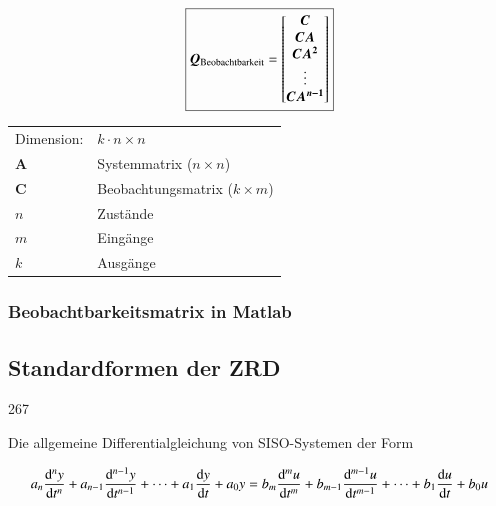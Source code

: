 \begin{minipage}[c]{0.4\columnwidth}
    $$ \boxed{ \bm{Q}_{\rm Beobachtbarkeit} = 
    \begin{bmatrix}
        \bm{C} \\ \bm{C A} \\ \bm{C A^2} \\ \vdots \\ \bm{C A^{n-1}} 
    \end{bmatrix} } $$
\end{minipage}
\hfill
\begin{minipage}[c]{0.58\columnwidth}
    \begin{tabular}{ll}
        Dimension:  & $k \cdot n \times n$ \\
        $\bm{A}$    & Systemmatrix ($n \times n$) \\
        $\bm{C}$    & Beobachtungsmatrix ($k \times m$) \\
        $n$         & Zustände \\
        $m$         & Eingänge \\
        $k$         & Ausgänge 
    \end{tabular}
\end{minipage}


\subsubsection*{Beobachtbarkeitsmatrix in Matlab}







\subsection{Standardformen der ZRD}{267}

Die allgemeine Differentialgleichung von SISO-Systemen der Form

$$ a_n \frac{\diff^n y}{\diff t^n} + a_{n-1} \frac{\diff^{n-1} y}{\diff t^{n-1}} + \cdots + a_1 \frac{\diff y}{\diff t} + a_0 y =
    b_m \frac{\diff^m u}{\diff t^m} + b_{m-1} \frac{\diff^{m-1} u}{\diff t^{m-1}} + \cdots + b_1 \frac{\diff u}{\diff t} + b_0 u  $$

